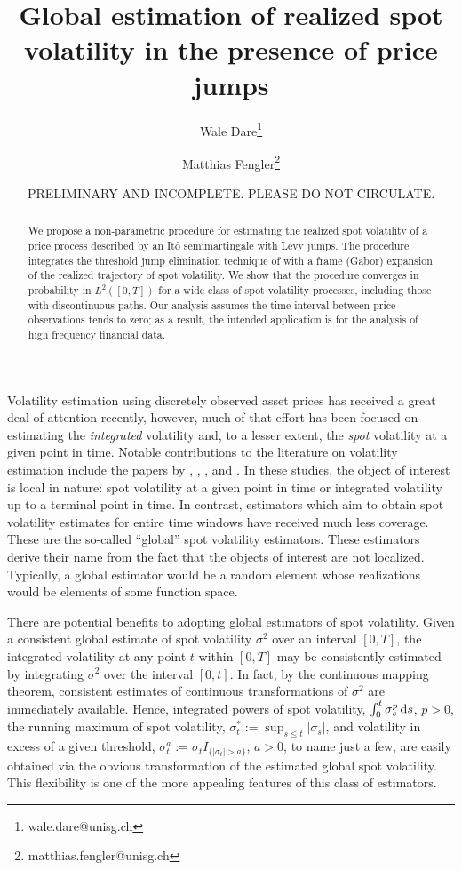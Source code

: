 \documentclass[a4paper, 12pt,preprint]{article}
\author{Wale Dare\thanks{wale.dare@unisg.ch} }
\author{Matthias Fengler\thanks{matthias.fengler@unisg.ch}}
\affil{Department of Mathematics and Statistics \\  University of St.Gallen \\  Switzerland}
\date{PRELIMINARY AND INCOMPLETE. PLEASE DO NOT CIRCULATE.}
\title {Global estimation of realized spot volatility in the presence of price jumps}
\newcommand{\ito}{It\^o\xspace}
\renewcommand{\D}{\ensuremath{\dif}\xspace}
\newcommand{\levy}{L\'evy\xspace}
\begin{document}
\maketitle
\begin{abstract}
  We propose a non-parametric procedure for estimating the realized spot volatility of a price process described by  an \ito semimartingale with \levy jumps. The procedure integrates the threshold jump elimination technique of \cite{Mancini2009}  with a  frame (Gabor)  expansion of the realized trajectory of  spot volatility.  We show that the procedure  converges in probability  in $L^2([0,T])$ for a wide class of spot volatility processes, including those with discontinuous paths. Our analysis assumes  the time interval between price observations tends to zero; as a result, the intended application is for the analysis of high frequency financial data.    

\end{abstract}
Volatility estimation using discretely observed asset prices has received a great deal of attention recently, however,  much of that effort has been focused on 
estimating the \emph{integrated} volatility and, to a lesser extent, the \emph{spot} volatility at a given point in time. 
Notable contributions to the literature on volatility estimation include the papers by \cite{Foster1996}, \cite{Fan2008},   \cite{Florens1993}, and  \cite{BN2004}.
In these studies, the object of interest is local in nature: spot volatility at a given point in time or integrated volatility up to a terminal point in time. In contrast,  estimators which aim  to obtain {spot} volatility estimates  for  entire time windows  have received much less coverage. These are the so-called ``global'' spot volatility estimators. These estimators derive their name from   the fact that the objects of interest are not localized. Typically, a global estimator would be a    random element whose realizations would be  elements of some function space.     

There are potential benefits to adopting global estimators of spot volatility. Given a consistent global estimate of spot volatility $\sigma^2$ over an interval $[0,T]$, the  integrated volatility at any point $t$ within $[0,T]$ may be consistently estimated  by integrating $\sigma^2$ over the interval $[0,t]$.  In fact, by the continuous mapping theorem, consistent estimates of continuous transformations of $\sigma^2$ are immediately available. Hence, integrated powers of spot volatility, $\int^t_0\sigma^p_s \D s$, $p > 0$,  the running maximum of spot volatility, $\sigma^*_t := \sup_{s \le t} \vert \sigma_s \vert$, and volatility in  excess of a given threshold, $\sigma^a_t:=  \sigma_t  I_{\{\vert \sigma_t \vert > a\}}$, $a > 0$,  to name just a few, are easily obtained via  the obvious  transformation of the estimated  global spot volatility.   This flexibility is one of the more appealing features  of this class of estimators.
\end{document}
